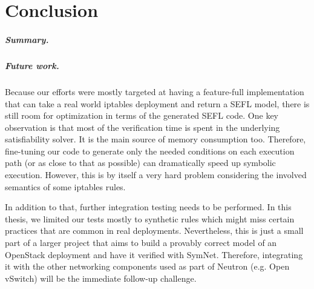 \chapter{Conclusion}

\paragraph{Summary.}

\paragraph{Future work.}
Because our efforts were mostly targeted at having a feature-full
implementation that can take a real world iptables deployment and return a SEFL
model, there is still room for optimization in terms of the generated SEFL
code.  One key observation is that most of the verification time is spent in
the underlying satisfiability solver.  It is the main source of memory
consumption too.  Therefore, fine-tuning our code to generate only the needed
conditions on each execution path (or as close to that as possible) can
dramatically speed up symbolic execution.  However, this is by itself a very
hard problem considering the involved semantics of some iptables rules.

In addition to that, further integration testing needs to be performed.  In
this thesis, we limited our tests mostly to synthetic rules which might miss
certain practices that are common in real deployments.  Nevertheless, this is
just a small part of a larger project that aims to build a provably correct
model of an OpenStack deployment and have it verified with SymNet.  Therefore,
integrating it with the other networking components used as part of Neutron
(e.g. Open vSwitch) will be the immediate follow-up challenge.
